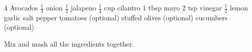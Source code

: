 \dishtype{\apps}
\dishother{\vegetarian}
\begin{ingreds}
    4 Avocados
    $\frac{1}{3}$ onion
    $\frac{1}{2}$ jalapeno
    $\frac{1}{4}$ cup cilantro
    1 tbsp mayo
    2 tsp vinegar
    $\frac{1}{2}$ lemon
    garlic salt
    pepper
    tomatoes (optional)
    stuffed olives (optional)
    cucumbers (optional)
\end{ingreds}
\begin{method}
    Mix and mash all the ingredients together.
\end{method}